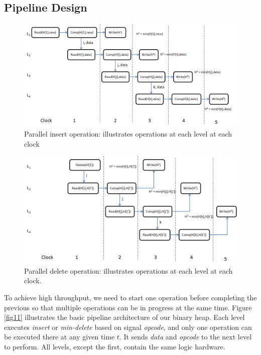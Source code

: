 

\subsection{Pipeline Design}
\begin{figure}[!ht]
  \centering
  \includegraphics[width=12cm]{fig/clock1.png}
      \caption{Parallel insert operation: illustrates operations at each level at each clock }
    \label{clock1}
\end{figure}

\begin{figure}[!ht]
  \centering
  \includegraphics[width=12cm]{fig/clock2.png}
      \caption{Parallel delete operation: illustrates operations at each level at each clock.  }
    \label{clock2}
\end{figure}

To achieve high throughput, we need to start one operation before completing the previous so that multiple operations can be in progress at the same time.
Figure \ref{fig11} illustrates the basic pipeline architecture of our binary heap.
Each level executes {\it insert} or {\it min-delete} based on signal {\it opcode}, and only one operation can be executed there at any given time $t$.
It sends {\it data} and {\it opcode} to the next level to perform.
All levels, except the first, contain the same logic hardware.

